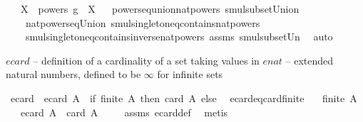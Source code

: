 \begin{isabellebody}
\ \ \ {\isachardoublequoteopen}X\ {\isasymcdots}\ {\isacharparenleft}{\kern0pt}powers\ g{\isacharparenright}{\kern0pt}\ {\isacharequal}{\kern0pt}\ X{\isachardoublequoteclose}%
\isadelimproof
\ %
\endisadelimproof
%
\isatagproof
{}\isamarkupfalse%
\ powers{\isacharunderscore}{\kern0pt}eq{\isacharunderscore}{\kern0pt}union{\isacharunderscore}{\kern0pt}nat{\isacharunderscore}{\kern0pt}powers\ smul{\isacharunderscore}{\kern0pt}subset{\isacharunderscore}{\kern0pt}Union{}\ \isanewline
\ \ \ \ nat{\isacharunderscore}{\kern0pt}powers{\isacharunderscore}{\kern0pt}eq{\isacharunderscore}{\kern0pt}Union\ smul{\isacharunderscore}{\kern0pt}singleton{\isacharunderscore}{\kern0pt}eq{\isacharunderscore}{\kern0pt}contains{\isacharunderscore}{\kern0pt}nat{\isacharunderscore}{\kern0pt}powers\ \isanewline
\ \ \ \ smul{\isacharunderscore}{\kern0pt}singleton{\isacharunderscore}{\kern0pt}eq{\isacharunderscore}{\kern0pt}contains{\isacharunderscore}{\kern0pt}inverse{\isacharunderscore}{\kern0pt}nat{\isacharunderscore}{\kern0pt}powers\ assms\ smul{\isacharunderscore}{\kern0pt}subset{\isacharunderscore}{\kern0pt}Un{}\ \isamarkupfalse%
\ auto%
\endisatagproof
{\isafoldproof}%
%
\isadelimproof
%
\endisadelimproof
\isanewline
\isanewline
{}\isamarkupfalse%
%
\isadelimdocument
%
\endisadelimdocument
%
\isatagdocument
%
\isamarkuptrue%
%
\endisatagdocument
{\isafolddocument}%
%
\isadelimdocument
%
\endisadelimdocument
%
\begin{isamarkuptext}%
$ecard$ -- definition of a cardinality of a set taking values in $enat$ -- extended natural numbers, defined to be $\infty$ for infinite sets%
\end{isamarkuptext}\isamarkuptrue%
\isamarkupfalse%
\ ecard\ \ {\isachardoublequoteopen}ecard\ A\ {\isacharequal}{\kern0pt}\ {\isacharparenleft}{\kern0pt}if\ finite\ A\ then\ card\ A\ else\ {\isasyminfinity}{\isacharparenright}{\kern0pt}{\isachardoublequoteclose}\isanewline
\isanewline
{}\isamarkupfalse%
\ ecard{\isacharunderscore}{\kern0pt}eq{\isacharunderscore}{\kern0pt}card{\isacharunderscore}{\kern0pt}finite{\isacharcolon}{\kern0pt}\isanewline
\ \ \ {\isachardoublequoteopen}finite\ A{\isachardoublequoteclose}\isanewline
\ \ \ {\isachardoublequoteopen}ecard\ A\ {\isacharequal}{\kern0pt}\ card\ A{\isachardoublequoteclose}\ \isanewline
%
\isadelimproof
\ \ %
\endisadelimproof
%
\isatagproof
{}\isamarkupfalse%
\ assms\ ecard{\isacharunderscore}{\kern0pt}def\ \isamarkupfalse%
\ metis%
\endisatagproof
{\isafoldproof}%
%
\isadelimproof
\isanewline
%
\endisadelimproof
%
\isadelimtheory
\isanewline
%
\endisadelimtheory
%
\isatagtheory
{}\isamarkupfalse%
%
\endisatagtheory
{\isafoldtheory}%
%
\isadelimtheory
%
\endisadelimtheory
%
\end{isabellebody}%
